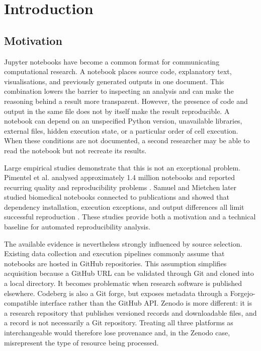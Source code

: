 \chapter{Introduction}
\label{chap:introduction}

\section{Motivation}

Jupyter notebooks have become a common format for communicating computational research. A notebook places source code, explanatory text, visualisations, and previously generated outputs in one document. This combination lowers the barrier to inspecting an analysis and can make the reasoning behind a result more transparent. However, the presence of code and output in the same file does not by itself make the result reproducible. A notebook can depend on an unspecified Python version, unavailable libraries, external files, hidden execution state, or a particular order of cell execution. When these conditions are not documented, a second researcher may be able to read the notebook but not recreate its results.

Large empirical studies demonstrate that this is not an exceptional problem. Pimentel et al. analysed approximately 1.4 million notebooks and reported recurring quality and reproducibility problems \cite{pimentel2019}. Samuel and Mietchen later studied biomedical notebooks connected to publications and showed that dependency installation, execution exceptions, and output differences all limit successful reproduction \cite{samuel2024computational}. These studies provide both a motivation and a technical baseline for automated reproducibility analysis.

The available evidence is nevertheless strongly influenced by source selection. Existing data collection and execution pipelines commonly assume that notebooks are hosted in GitHub repositories. This assumption simplifies acquisition because a GitHub URL can be validated through Git and cloned into a local directory. It becomes problematic when research software is published elsewhere. Codeberg is also a Git forge, but exposes metadata through a Forgejo-compatible interface rather than the GitHub API. Zenodo is more different: it is a research repository that publishes versioned records and downloadable files, and a record is not necessarily a Git repository. Treating all three platforms as interchangeable would therefore lose provenance and, in the Zenodo case, misrepresent the type of resource being processed.

